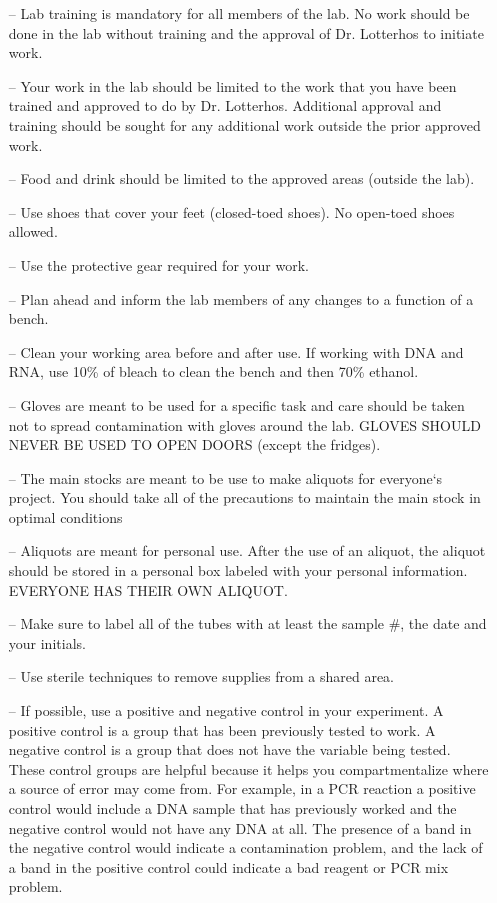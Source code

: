 \documentclass[11pt, oneside]{article}
\begin{document}
		\begin{itemize}

			\item[--] Lab training is mandatory for all members of the lab. No work should be done in the lab without training and the approval of Dr. 				Lotterhos to initiate work. 
			\item[--] Your work in the lab should be limited to the work that you have been trained and approved to do by Dr. Lotterhos. Additional 				approval and training should be sought for any additional work outside the prior approved work.
			\item[--] Food and drink should be limited to the approved areas (outside the lab).
			\item[--] Use shoes that cover your feet (closed-toed shoes). No open-toed shoes allowed.
			\item[--] Use the protective gear required for your work.
			\item[--] Plan ahead and inform the lab members of any changes to a function of a bench. 
			\item[--] Clean your working area before and after use. If working with DNA and RNA, use 10\% of bleach to clean the bench and then 70\% 			ethanol. 
			\item[--] Gloves are meant to be used for a specific task and care should be taken not to spread contamination with gloves around the lab.  GLOVES SHOULD NEVER BE USED TO OPEN DOORS (except the fridges).
			\item[--] The main stocks are meant to be use to make aliquots for everyone`s project. You should take all of the precautions to maintain 				the main stock in optimal conditions
			\item[--] Aliquots are meant for personal use. After the use of an aliquot, the aliquot should be stored in a personal box labeled with your 				personal information.  EVERYONE HAS THEIR OWN ALIQUOT.
			\item[--] Make sure to label all of the tubes with at least the sample \#, the date and your initials. 
			\item[--] Use sterile techniques to remove supplies from a shared area. 
			\item[--] If possible, use a positive and negative control in your experiment. A positive control is a group that has been previously tested to 			work. A negative control is a group that does not have the variable being tested. These control groups are helpful because it helps you 				compartmentalize where a source of error may come from. For example, in a PCR reaction a positive control would include a DNA sample 			that has previously worked and the negative control would not have any DNA at all. The presence of a band in the negative control would 			indicate a contamination problem, and the lack of a band in the positive control could indicate a bad reagent or PCR mix problem. 

\end{itemize}
\end{document}
